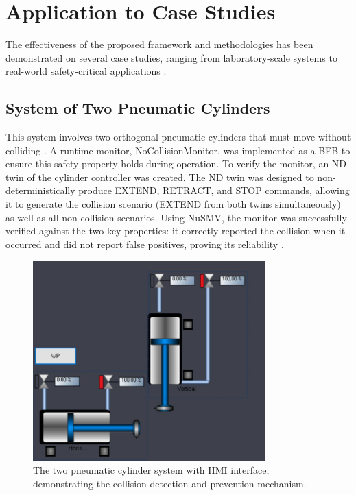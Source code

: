 \section{Application to Case Studies}\label{sec:case_studies}

The effectiveness of the proposed framework and methodologies has been demonstrated on several case studies, ranging from laboratory-scale systems to real-world safety-critical applications \cite{xavier2023formal}.

\subsection{System of Two Pneumatic Cylinders}

This system involves two orthogonal pneumatic cylinders that must move without colliding \cite{17jhunjhunwala2022monitoring}. A runtime monitor, NoCollisionMonitor, was implemented as a BFB to ensure this safety property holds during operation. To verify the monitor, an ND twin of the cylinder controller was created. The ND twin was designed to non-deterministically produce EXTEND, RETRACT, and STOP commands, allowing it to generate the collision scenario (EXTEND from both twins simultaneously) as well as all non-collision scenarios. Using NuSMV, the monitor was successfully verified against the two key properties: it correctly reported the collision when it occurred and did not report false positives, proving its reliability \cite{nusmv}.

\begin{figure}[h]
\centering
\includegraphics[width=0.8\textwidth]{chapters/images/chapter2/2cylindre_hmi.JPG}
\caption{The two pneumatic cylinder system with HMI interface, demonstrating the collision detection and prevention mechanism.}
\label{fig:two_cylinders}
\end{figure}

